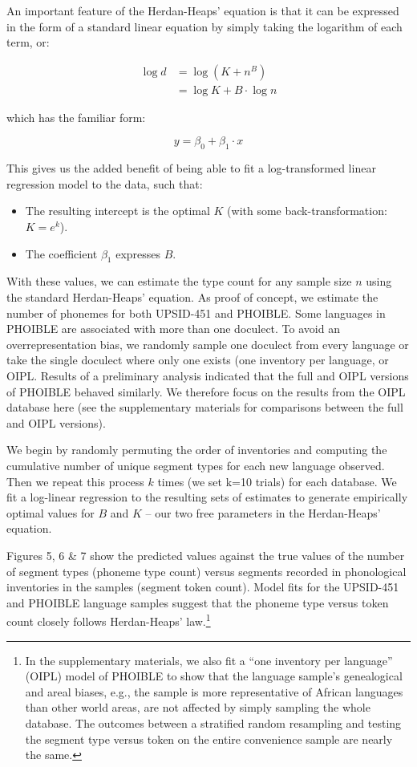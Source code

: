 \documentclass[
]{article}
\providecommand{\tightlist}{%
  \setlength{\itemsep}{0pt}\setlength{\parskip}{0pt}}
\begin{document}
An important feature of the Herdan-Heaps' equation is that it can be
expressed in the form of a standard linear equation by simply taking the
logarithm of each term, or:

\[
\begin{aligned}
  \log d & = \log (K + n^B)\\
  & = \log K + B \cdot \log n
\end{aligned}  
\]

which has the familiar form:

\[y = \beta_0 + \beta_1 \cdot x\]

This gives us the added benefit of being able to fit a log-transformed
linear regression model to the data, such that:

\begin{itemize}
\tightlist
\item
  The resulting intercept is the optimal \(K\) (with some
  back-transformation: \(K = e^k\)).
\item
  The coefficient \(\beta_1\) expresses \(B\).
\end{itemize}

With these values, we can estimate the type count for any sample size
\(n\) using the standard Herdan-Heaps' equation. As proof of concept, we
estimate the number of phonemes for both UPSID-451 and PHOIBLE. Some
languages in PHOIBLE are associated with more than one doculect. To
avoid an overrepresentation bias, we randomly sample one doculect from
every language or take the single doculect where only one exists (one
inventory per language, or OIPL. Results of a preliminary analysis
indicated that the full and OIPL versions of PHOIBLE behaved similarly.
We therefore focus on the results from the OIPL database here (see the
supplementary materials for comparisons between the full and OIPL
versions).

We begin by randomly permuting the order of inventories and computing
the cumulative number of unique segment types for each new language
observed. Then we repeat this process \(k\) times (we set k=10 trials)
for each database. We fit a log-linear regression to the resulting sets
of estimates to generate empirically optimal values for \(B\) and \(K\)
-- our two free parameters in the Herdan-Heaps' equation.

Figures 5, 6 \& 7 show the predicted values against the true values of
the number of segment types (phoneme type count) versus segments
recorded in phonological inventories in the samples (segment token
count). Model fits for the UPSID-451 and PHOIBLE language samples
suggest that the phoneme type versus token count closely follows
Herdan-Heaps' law.\footnote{In the supplementary materials, we also fit
  a ``one inventory per language'' (OIPL) model of PHOIBLE to show that
  the language sample's genealogical and areal biases, e.g., the sample
  is more representative of African languages than other world areas,
  are not affected by simply sampling the whole database. The outcomes
  between a stratified random resampling and testing the segment type
  versus token on the entire convenience sample are nearly the same.}
\end{document}
